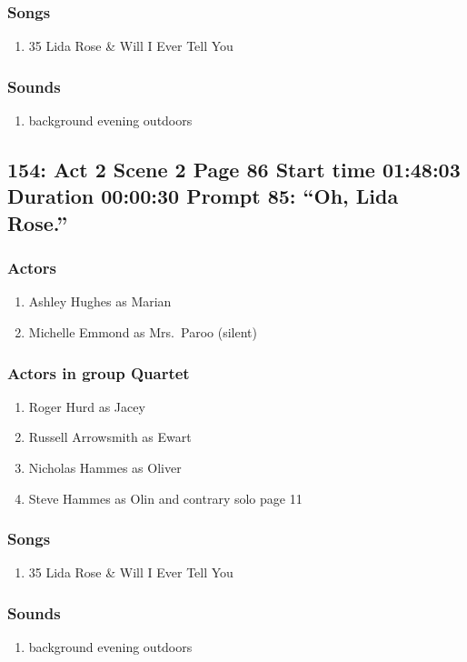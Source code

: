 \subsubsection{Songs}
\begin{enumerate}
\item 35 Lida Rose \& Will I Ever Tell You
\end{enumerate}\subsubsection{Sounds}
\begin{enumerate}
\item background evening outdoors
\end{enumerate}
\subsection{154: Act 2 Scene 2 Page 86 Start time 01:48:03 Duration 00:00:30 Prompt 85: ``Oh, Lida Rose.''}

\subsubsection{Actors}
\begin{enumerate}
\item Ashley Hughes as Marian
\item Michelle Emmond as Mrs.~Paroo (silent)
\end{enumerate}
\subsubsection{Actors in group Quartet}
\begin{enumerate}
\item Roger Hurd as Jacey
\item Russell Arrowsmith as Ewart
\item Nicholas Hammes as Oliver
\item Steve Hammes as Olin and contrary solo page 11
\end{enumerate}

\subsubsection{Songs}
\begin{enumerate}
\item 35 Lida Rose \& Will I Ever Tell You
\end{enumerate}\subsubsection{Sounds}
\begin{enumerate}
\item background evening outdoors
\end{enumerate}
